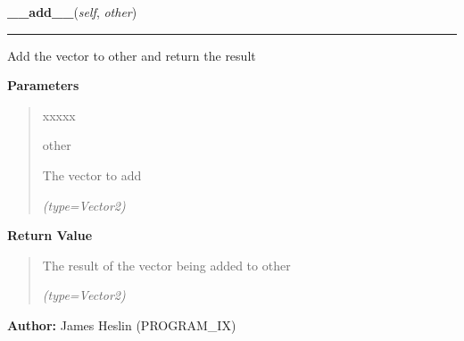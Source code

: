 \hspace{.8\funcindent}\begin{boxedminipage}{\funcwidth}

    \raggedright \textbf{\_\_add\_\_}(\textit{self}, \textit{other})

    \vspace{-1.5ex}

    \rule{\textwidth}{0.5\fboxrule}
\setlength{\parskip}{2ex}
    Add the vector to other and return the result

\setlength{\parskip}{1ex}
      \textbf{Parameters}
      \vspace{-1ex}

      \begin{quote}
        \begin{Ventry}{xxxxx}

          \item[other]

          The vector to add

            {\it (type=Vector2)}

        \end{Ventry}

      \end{quote}

      \textbf{Return Value}
    \vspace{-1ex}

      \begin{quote}
      The result of the vector being added to other

      {\it (type=Vector2)}

      \end{quote}

\textbf{Author:} James Heslin (PROGRAM\_IX)



    \end{boxedminipage}

    \label{pystroke:vector2:Vector2:__sub__}

    \vspace{0.5ex}


